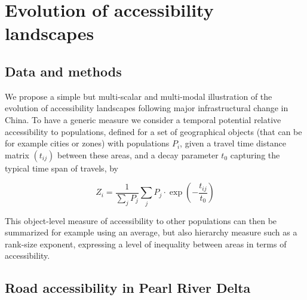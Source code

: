 \section{Evolution of accessibility landscapes}





\subsection{Data and methods}

We propose a simple but multi-scalar and multi-modal illustration of the evolution of accessibility landscapes following major infrastructural change in China. To have a generic measure we consider a temporal potential relative accessibility to populations, defined for a set of geographical objects (that can be for example cities or zones) with populations $P_i$, given a travel time distance matrix $(t_{ij})$ between these areas, and a decay parameter $t_0$ capturing the typical time span of travels, by

\[
Z_i = \frac{1}{\sum_j P_j} \sum_j P_j \cdot \exp{\left(- \frac{t_{ij}}{t_0}\right)}
\]

This object-level measure of accessibility to other populations can then be summarized for example using an average, but also hierarchy measure such as a rank-size exponent, expressing a level of inequality between areas in terms of accessibility.





\subsection{Road accessibility in Pearl River Delta}



